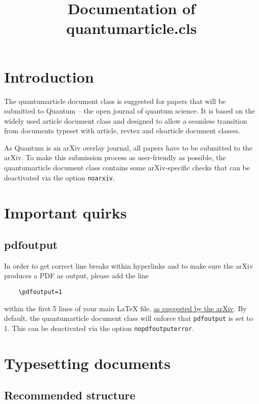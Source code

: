 \documentclass[a4paper,noarxiv,onecolumn]{quantumarticle}
\begin{document}
	\title{Documentation of quantumarticle.cls}
	\maketitle
	
	\tableofcontents
	
	\clearpage
	
	\section{Introduction}
	The quantumarticle document class is suggested for papers that will be submitted to Quantum -- the open journal of quantum science. It is based on the widely used article document class and designed to allow a seamless transition from documents typeset with article, revtex and elsarticle document classes. 
	
	As Quantum is an arXiv overlay journal, all papers have to be submitted to the arXiv. To make this submission process as user-friendly as possible, the quantumarticle document class contains some arXiv-specific checks that can be deactivated via the option \texttt{noarxiv}.
	
	\section{Important quirks}
	
	\subsection{pdfoutput}
	In order to get correct line breaks within hyperlinks and to make sure the arXiv produces a PDF as output, please add the line 
	\begin{verbatim}
	\pdfoutput=1
	\end{verbatim}
	within the first 5 lines of your main LaTeX file, \href{https://arxiv.org/help/submit_tex}{as suggested by the arXiv}. By default, the quantumarticle document class will enforce that \texttt{pdfoutput} is set to 1. This can be deactivated via the option \texttt{nopdfoutputerror}.
	
	\section{Typesetting documents}
	
	\subsection{Recommended structure}	
	
\end{document}
